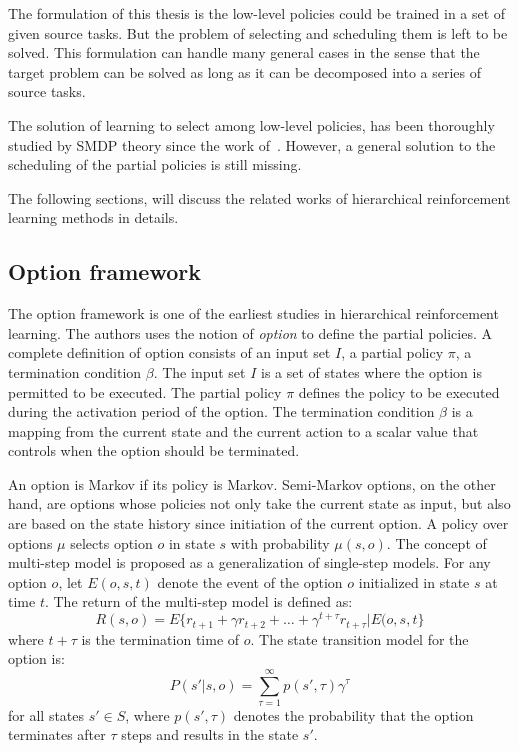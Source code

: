 The formulation of this thesis is the low-level policies could be trained in a set of given source tasks. But the problem of selecting and scheduling them is left to be solved. This formulation can handle many general cases in the sense that the target problem can be solved as long as it can be decomposed into a series of source tasks.

The solution of learning to select among low-level policies, has been thoroughly studied by SMDP theory since the work of~\cite{sutton1999between}. However, a general solution to the scheduling of the partial policies is still missing.

The following sections, will discuss the related works of hierarchical reinforcement learning methods in details.

\subsection{Option framework}
The option framework \cite{sutton1999between} is one of the earliest studies in hierarchical reinforcement learning. The authors uses the notion of \textit{option} to define the partial policies. A complete definition of option consists of an input set $I$, a partial policy $\pi$, a termination condition $\beta$. The input set $I$ is a set of states where the option is permitted to be executed. The partial policy $\pi$ defines the policy to be executed during the activation period of the option. The termination condition $\beta$ is a mapping from the current state and the current action to a scalar value that controls when the option should be terminated.

An option is Markov if its policy is Markov. Semi-Markov options, on the other hand, are options whose policies not only take the current state as input, but also are based on the state history since initiation of the current option. A policy over options \(\mu \) selects option \(o\) in state \(s\) with probability \(\mu(s,o)\). The concept of multi-step model is proposed as a generalization of single-step models. For any option \(o\), let \(E(o,s,t)\) denote the event of the option $o$ initialized in state $s$ at time $t$. The return of the multi-step model is defined as:
\[ R(s,o)=E\{r_{t+1}+\gamma r_{t+2}+\ldots+\gamma^{t+\tau} r_{t+\tau} \lvert E(o,s,t\} \]
where $t+\tau$ is the termination time of $o$. The state transition model for the option is:
\[P(s' \lvert s,o)=\sum_{\tau=1}^{\infty} p(s',\tau) \gamma^\tau \]
for all states \(s' \in S \), where \( p(s',\tau) \) denotes the probability that the option terminates after \(\tau\) steps and results in the state \(s'\).

